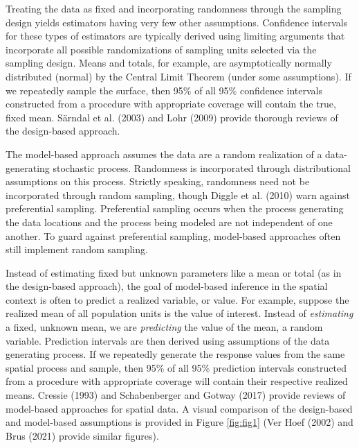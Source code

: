 \documentclass[]{elsarticle} %
\begin{document}
Treating the data as fixed and incorporating randomness through the
sampling design yields estimators having very few other assumptions.
Confidence intervals for these types of estimators are typically derived
using limiting arguments that incorporate all possible randomizations of
sampling units selected via the sampling design. Means and totals, for
example, are asymptotically normally distributed (normal) by the Central
Limit Theorem (under some assumptions). If we repeatedly sample the
surface, then 95\% of all 95\% confidence intervals constructed from a
procedure with appropriate coverage will contain the true, fixed mean.
Särndal et al. (2003) and Lohr (2009) provide thorough reviews of the
design-based approach.

The model-based approach assumes the data are a random realization of a
data-generating stochastic process. Randomness is incorporated through
distributional assumptions on this process. Strictly speaking,
randomness need not be incorporated through random sampling, though
Diggle et al. (2010) warn against preferential sampling. Preferential
sampling occurs when the process generating the data locations and the
process being modeled are not independent of one another. To guard
against preferential sampling, model-based approaches often still
implement random sampling.

Instead of estimating fixed but unknown parameters like a mean or total
(as in the design-based approach), the goal of model-based inference in
the spatial context is often to predict a realized variable, or value.
For example, suppose the realized mean of all population units is the
value of interest. Instead of \emph{estimating} a fixed, unknown mean,
we are \emph{predicting} the value of the mean, a random variable.
Prediction intervals are then derived using assumptions of the data
generating process. If we repeatedly generate the response values from
the same spatial process and sample, then 95\% of all 95\% prediction
intervals constructed from a procedure with appropriate coverage will
contain their respective realized means. Cressie (1993) and
Schabenberger and Gotway (2017) provide reviews of model-based
approaches for spatial data. A visual comparison of the design-based and
model-based assumptions is provided in Figure \ref{fig:fig1} (Ver Hoef
(2002) and Brus (2021) provide similar figures).
\end{document}
